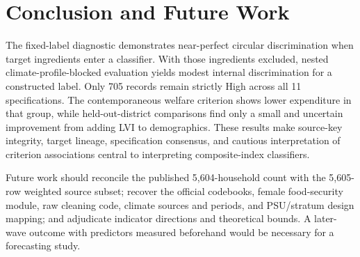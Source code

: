 \documentclass[conference,a4paper]{IEEEtran}
\begin{document}
\section{Conclusion and Future Work}
The fixed-label diagnostic demonstrates near-perfect circular discrimination when target ingredients enter a classifier. With those ingredients excluded, nested climate-profile-blocked evaluation yields modest internal discrimination for a constructed label. Only 705 records remain strictly High across all 11 specifications. The contemporaneous welfare criterion shows lower expenditure in that group, while held-out-district comparisons find only a small and uncertain improvement from adding LVI to demographics. These results make source-key integrity, target lineage, specification consensus, and cautious interpretation of criterion associations central to interpreting composite-index classifiers.

Future work should reconcile the published 5,604-household count with the 5,605-row weighted source subset; recover the official codebooks, female food-security module, raw cleaning code, climate sources and periods, and PSU/stratum design mapping; and adjudicate indicator directions and theoretical bounds. A later-wave outcome with predictors measured beforehand would be necessary for a forecasting study.



\end{document}
